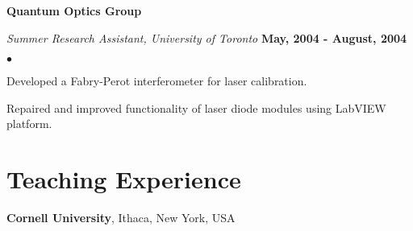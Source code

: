 \documentclass[margin,line]{res}
\newenvironment{list2}{
  \begin{list}{$\bullet$}{%
      \setlength{\itemsep}{0in}
      \setlength{\parsep}{0in} \setlength{\parskip}{0in}
      \setlength{\topsep}{0in} \setlength{\partopsep}{0in} 
      \setlength{\leftmargin}{0.2in}}}{\end{list}}
\begin{document}
\begin{resume}
{\bf Quantum Optics Group}

\vspace{-.3cm}
{\em Summer Research Assistant, University of Toronto} \hfill {\bf May, 2004 - August, 2004}\\
\vspace*{-2mm}
\begin{list2}
\item Developed a Fabry-Perot interferometer for laser calibration.
\item Repaired and improved functionality of laser diode modules using
  LabVIEW platform.
\end{list2}

\newpage

\section{\sc Teaching Experience}

{\bf Cornell University}, Ithaca, New York, USA


\end{resume}
\end{document}

